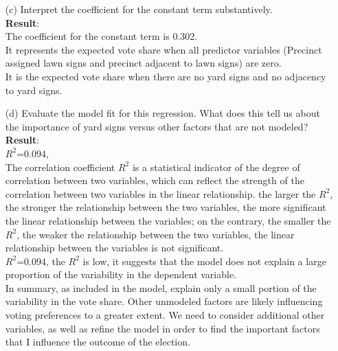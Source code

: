 \documentclass[12pt,letterpaper]{article}
\begin{document}
\begin{enumerate}
	\item [(c)] Interpret the coefficient for the constant term substantively.
	\vspace{.25cm}\\
	\textbf{Result}:\\
	The coefficient for the constant term is 0.302.\\
	It represents the expected vote share when all predictor variables (Precinct assigned lawn signs and precinct adjacent to lawn signs) are zero.\\
	It is the expected vote share when there are no yard signs and no adjacency to yard signs.\\
	
	
	
	\item [(d)] Evaluate the model fit for this regression.  What does this	tell us about the importance of yard signs versus other factors that are not modeled?
	\vspace{.25cm}\\
	\textbf{Result}:\\
	$R^2$=0.094,\\
	The correlation coefficient $R^2$ is a statistical indicator of the degree of correlation between two variables, which can reflect the strength of the correlation between two variables in the linear relationship. the larger the $R^2$, the stronger the relationship between the two variables, the more significant the linear relationship between the variables; on the contrary, the smaller the $R^2$, the weaker the relationship between the two variables, the linear relationship between the variables is not significant.\\
	
	$R^2$=0.094, the $R^2$ is low, it suggests that the model does not explain a large proportion of the variability in the dependent variable.\\
	
	In summary, as included in the model, explain only a small portion of the variability in the vote share. Other unmodeled factors are likely influencing voting preferences to a greater extent. We need to consider additional other variables, as well as refine the model in order to find the important factors that I influence the outcome of the election.\\
\end{enumerate}  
\end{document}
